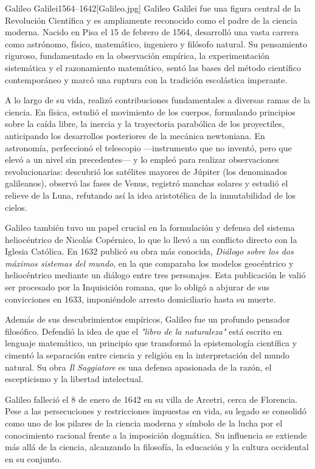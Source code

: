 \begin{semblanza}{Galileo Galilei}{1564–1642}[Galileo.jpg]
    Galileo Galilei fue una figura central de la Revolución Científica y es ampliamente reconocido como el padre de la ciencia moderna. Nacido en Pisa el 15 de febrero de 1564, desarrolló una vasta carrera como astrónomo, físico, matemático, ingeniero y filósofo natural. Su pensamiento riguroso, fundamentado en la observación empírica, la experimentación sistemática y el razonamiento matemático, sentó las bases del método científico contemporáneo y marcó una ruptura con la tradición escolástica imperante.

    A lo largo de su vida, realizó contribuciones fundamentales a diversas ramas de la ciencia. En física, estudió el movimiento de los cuerpos, formulando principios sobre la caída libre, la inercia y la trayectoria parabólica de los proyectiles, anticipando los desarrollos posteriores de la mecánica newtoniana. En astronomía, perfeccionó el telescopio —instrumento que no inventó, pero que elevó a un nivel sin precedentes— y lo empleó para realizar observaciones revolucionarias: descubrió los satélites mayores de Júpiter (los denominados galileanos), observó las fases de Venus, registró manchas solares y estudió el relieve de la Luna, refutando así la idea aristotélica de la inmutabilidad de los cielos.

    Galileo también tuvo un papel crucial en la formulación y defensa del sistema heliocéntrico de Nicolás Copérnico, lo que lo llevó a un conflicto directo con la Iglesia Católica. En 1632 publicó su obra más conocida, \textit{Diálogo sobre los dos máximos sistemas del mundo}, en la que comparaba los modelos geocéntrico y heliocéntrico mediante un diálogo entre tres personajes. Esta publicación le valió ser procesado por la Inquisición romana, que lo obligó a abjurar de sus convicciones en 1633, imponiéndole arresto domiciliario hasta su muerte.

    Además de sus descubrimientos empíricos, Galileo fue un profundo pensador filosófico. Defendió la idea de que el \textit{"libro de la naturaleza"} está escrito en lenguaje matemático, un principio que transformó la epistemología científica y cimentó la separación entre ciencia y religión en la interpretación del mundo natural. Su obra \textit{Il Saggiatore} es una defensa apasionada de la razón, el escepticismo y la libertad intelectual.

    Galileo falleció el 8 de enero de 1642 en su villa de Arcetri, cerca de Florencia. Pese a las persecuciones y restricciones impuestas en vida, su legado se consolidó como uno de los pilares de la ciencia moderna y símbolo de la lucha por el conocimiento racional frente a la imposición dogmática. Su influencia se extiende más allá de la ciencia, alcanzando la filosofía, la educación y la cultura occidental en su conjunto.
\end{semblanza}